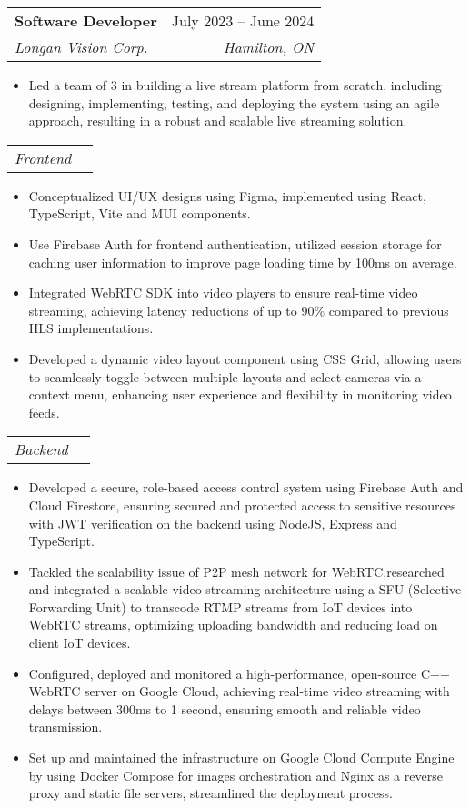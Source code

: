 \documentclass[letterpaper,11pt]{article}
\makeatletter
\newcommand{\resumeItem}[1]{
  \item\small{
    {#1 \vspace{-2pt}}
  }
}
\newcommand{\resumeSubheading}[4]{
  \vspace{-2pt}\item
    \begin{tabular*}{0.97\textwidth}[t]{l@{\extracolsep{\fill}}r}
      \textbf{#1} & #2 \\
      \textit{\small#3} & \textit{\small #4} \\
    \end{tabular*}\vspace{-7pt}
}
\newcommand{\resumeSubSubheading}[2]{
    \item
    \begin{tabular*}{0.97\textwidth}{l@{\extracolsep{\fill}}r}
      \textit{\small#1} & \textit{\small #2} \\
    \end{tabular*}\vspace{-7pt}
}
\newcommand{\resumeSubItem}[1]{
  \begin{itemize}[leftmargin=0.2in, label=\textbullet]
    \item\small{
      {#1 \vspace{-2pt}}
    }
  \end{itemize}
}
\newcommand{\resumeItemListStart}{\begin{itemize}}
\newcommand{\resumeItemListEnd}{\end{itemize}\vspace{-5pt}}
\makeatother
\begin{document}
    \resumeSubheading
      {Software Developer}{July 2023 -- June 2024}
      {Longan Vision Corp.}{Hamilton, ON}
        \resumeItemListStart
          \resumeItem{Led a team of 3 in building a live stream platform from scratch, including designing, implementing, testing, and deploying the system using an agile approach, resulting in a robust and scalable live streaming solution.}
        \resumeItemListEnd
      \resumeSubSubheading{Frontend}{}
        \resumeItemListStart
          \resumeItem{Conceptualized UI/UX designs using Figma, implemented using React,  TypeScript, Vite and MUI components.}
          \resumeItem{Use Firebase Auth for frontend authentication, utilized session storage for caching user information to improve page loading time by 100ms on average.}
          \resumeItem{Integrated WebRTC SDK into video players to ensure real-time video streaming, achieving latency reductions of up to 90\% compared to previous HLS implementations.}
          \resumeItem{Developed a dynamic video layout component using CSS Grid, allowing users to   seamlessly toggle between multiple layouts and select cameras via a context menu, enhancing user experience and flexibility in monitoring video feeds.}
        \resumeItemListEnd
      \resumeSubSubheading{Backend}{}
      \resumeItemListStart
          \resumeItem{Developed a secure, role-based access control system using Firebase Auth and Cloud Firestore, ensuring secured and protected access to sensitive resources with JWT verification on the backend using NodeJS, Express and TypeScript.}
          \resumeItem{Tackled the scalability issue of P2P mesh network for WebRTC,researched and integrated a scalable video streaming architecture using a SFU (Selective Forwarding Unit) to transcode RTMP streams from IoT devices into WebRTC streams, optimizing uploading bandwidth and reducing load on client IoT devices.}
          \resumeItem{Configured, deployed and monitored a high-performance, open-source C++ WebRTC server on Google Cloud, achieving real-time video streaming with delays between 300ms to 1 second, ensuring smooth and reliable video transmission.}
          \resumeItem{Set up and maintained the infrastructure on Google Cloud Compute Engine by using Docker Compose for images orchestration and Nginx as a reverse proxy and static file servers, streamlined the deployment process.}
        \resumeItemListEnd
  
\end{document}
